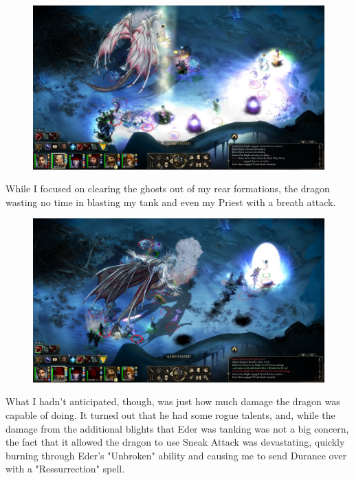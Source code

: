 \documentclass{article}
\begin{document}
\begin{figure}
\includegraphics[scale=0.33]{files/blog/2019_08_17_poe_potd_wmpt1/2019_08_17_alpine_dragon_2.jpg}
\end{figure}

While I focused on clearing the ghosts out of my rear formations, the dragon wasting no time in blasting my tank and even my Priest with a breath attack.

\begin{figure}
\includegraphics[scale=0.33]{files/blog/2019_08_17_poe_potd_wmpt1/2019_08_17_alpine_dragon_3.jpg}
\end{figure}

What I hadn't anticipated, though, was just how much damage the dragon was capable of doing.  It turned out that he had some rogue talents, and, while the damage from the additional blights that Eder was tanking was not a big concern, the fact that it allowed the dragon to use Sneak Attack was devastating, quickly burning through Eder's "Unbroken" ability and causing me to send Durance over with a "Ressurrection" spell.
\end{document}
